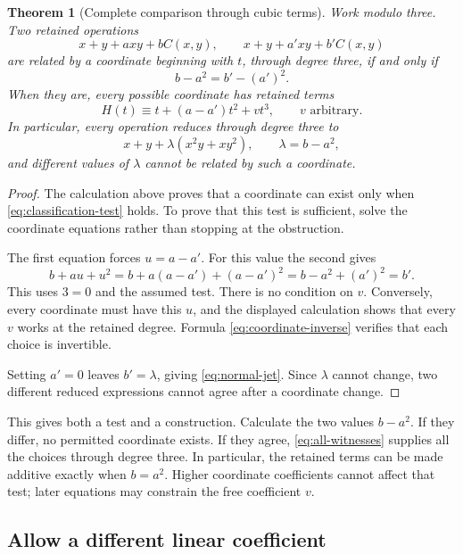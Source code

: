 \documentclass[11pt,letterpaper]{article}
\numberwithin{equation}{section}
\newtheorem{theorem}{Theorem}[section]
\theoremstyle{definition}\newtheorem{example}[theorem]{Example}
\begin{document}
\begin{theorem}[Complete comparison through cubic terms]\label{thm:cubic}
Work modulo three. Two retained operations
\[
 x+y+a xy+bC(x,y),\qquad x+y+a'xy+b'C(x,y)
\]
are related by a coordinate beginning with \(t\), through degree three, if and only if
\begin{equation}\label{eq:classification-test}
 b-a^2=b'-(a')^2.
\end{equation}
When they are, every possible coordinate has retained terms
\begin{equation}\label{eq:all-witnesses}
 H(t)\equiv t+(a-a')t^2+vt^3,
 \qquad v\text{ arbitrary}.
\end{equation}
In particular, every operation reduces through degree three to
\begin{equation}\label{eq:normal-jet}
 x+y+\lambda(x^2y+xy^2),\qquad \lambda=b-a^2,
\end{equation}
and different values of \(\lambda\) cannot be related by such a coordinate.
\end{theorem}

\begin{proof}
The calculation above proves that a coordinate can exist only when \eqref{eq:classification-test} holds. To prove that this test is sufficient, solve the coordinate equations rather than stopping at the obstruction.

The first equation forces \(u=a-a'\). For this value the second gives
\[
 b+au+u^2=b+a(a-a')+(a-a')^2
 =b-a^2+(a')^2=b'.
\]
This uses \(3=0\) and the assumed test. There is no condition on \(v\). Conversely, every coordinate must have this \(u\), and the displayed calculation shows that every \(v\) works at the retained degree. Formula \eqref{eq:coordinate-inverse} verifies that each choice is invertible.

Setting \(a'=0\) leaves \(b'=\lambda\), giving \eqref{eq:normal-jet}. Since \(\lambda\) cannot change, two different reduced expressions cannot agree after a coordinate change.
\end{proof}

This gives both a test and a construction. Calculate the two values \(b-a^2\). If they differ, no permitted coordinate exists. If they agree, \eqref{eq:all-witnesses} supplies all the choices through degree three. In particular, the retained terms can be made additive exactly when \(b=a^2\). Higher coordinate coefficients cannot affect that test; later equations may constrain the free coefficient \(v\).

\subsection{Allow a different linear coefficient}
\end{document}
